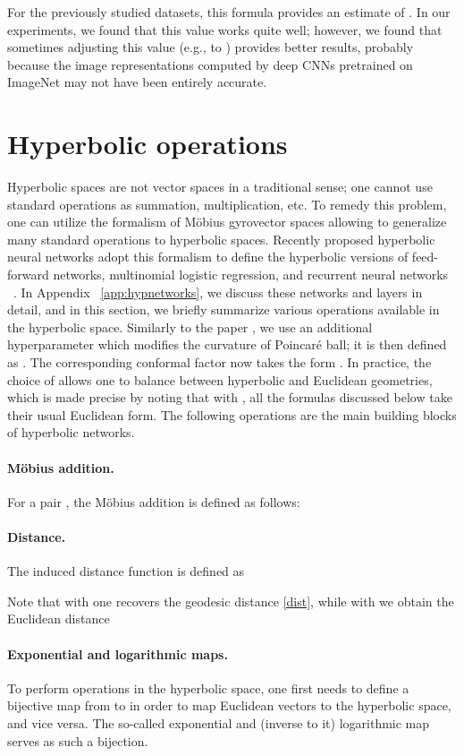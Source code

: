 \documentclass[10pt,twocolumn,letterpaper]{article}
\begin{document}
For the previously studied datasets, this formula provides an estimate of . In our experiments, we found that this value works quite well; however, we found that sometimes adjusting this value (e.g., to ) provides better results, probably because the image representations computed by deep CNNs pretrained on ImageNet may not have been entirely accurate.


 \section{Hyperbolic operations}\label{sec:hyp-neural}
Hyperbolic spaces are not vector spaces in a traditional sense; one cannot use standard operations as summation, multiplication, etc. To remedy this problem, one can utilize the formalism of  M\"obius gyrovector spaces allowing to generalize many standard operations to hyperbolic spaces. Recently proposed hyperbolic neural networks adopt this formalism to define the hyperbolic versions of feed-forward networks, multinomial logistic regression, and recurrent neural networks ~\cite{ganea2018hyperbolic}. 
In Appendix ~\ref{app:hypnetworks}, we discuss these networks and layers in detail, and in this section, we briefly summarize various operations available in the hyperbolic space. Similarly to the paper \cite{ganea2018hyperbolic}, we use an additional hyperparameter  which modifies the curvature of Poincar\'e ball; it is then defined as \mbox{}. The corresponding conformal factor now takes the form . In practice, the choice of  allows one to balance between hyperbolic and Euclidean geometries, which is made precise by noting that with , all the formulas discussed below take their usual Euclidean form. The following operations are the main building blocks of hyperbolic networks.

\paragraph{M\"obius addition.} 
For a pair , the M\"obius addition is defined as follows:


\paragraph{Distance.} 
The induced distance function is defined as 

Note that with  one recovers the geodesic distance \eqref{dist}, while with  we obtain the Euclidean distance 

\paragraph{Exponential and logarithmic maps.} 
To perform operations in the hyperbolic space, one first needs to define a bijective map from  to  in order to map Euclidean vectors to the hyperbolic space, and vice versa.  The so-called exponential and (inverse to it) logarithmic map serves as such a bijection. 
\end{document}
